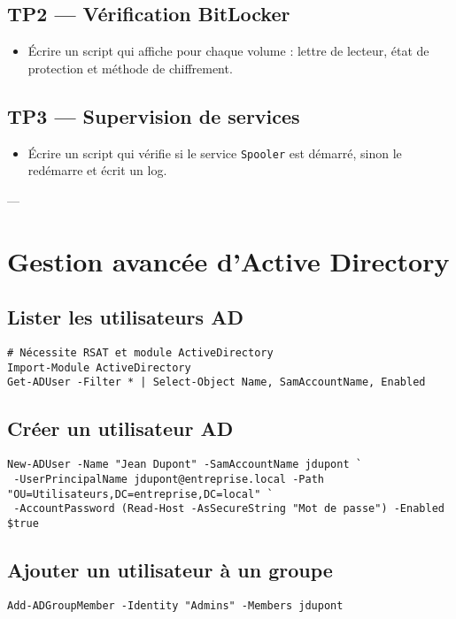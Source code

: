 \documentclass[a4paper,12pt]{article}
\begin{document}
\subsection{TP2 — Vérification BitLocker}
\begin{itemize}
  \item Écrire un script qui affiche pour chaque volume : lettre de lecteur, état de protection et méthode de chiffrement.
\end{itemize}

\subsection{TP3 — Supervision de services}
\begin{itemize}
  \item Écrire un script qui vérifie si le service \texttt{Spooler} est démarré, sinon le redémarre et écrit un log.
\end{itemize}

---


\section{Gestion avancée d’Active Directory}
\subsection{Lister les utilisateurs AD}
\begin{verbatim}
# Nécessite RSAT et module ActiveDirectory
Import-Module ActiveDirectory
Get-ADUser -Filter * | Select-Object Name, SamAccountName, Enabled
\end{verbatim}

\subsection{Créer un utilisateur AD}
\begin{verbatim}
New-ADUser -Name "Jean Dupont" -SamAccountName jdupont `
 -UserPrincipalName jdupont@entreprise.local -Path "OU=Utilisateurs,DC=entreprise,DC=local" `
 -AccountPassword (Read-Host -AsSecureString "Mot de passe") -Enabled $true
\end{verbatim}

\subsection{Ajouter un utilisateur à un groupe}
\begin{verbatim}
Add-ADGroupMember -Identity "Admins" -Members jdupont
\end{verbatim}
\end{document}
